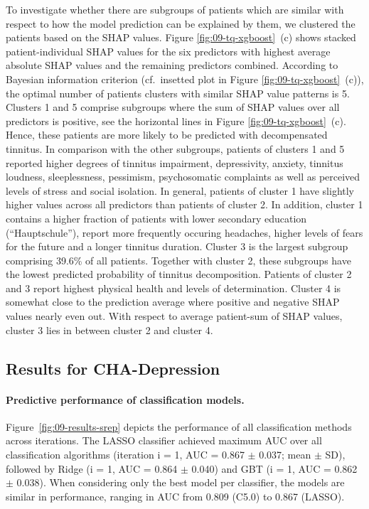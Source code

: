 \documentclass[
  oneside]{book}
\begin{document}
To investigate whether there are subgroups of patients which are similar with respect to how the model prediction can be explained by them, we clustered the patients based on the SHAP values.
Figure \ref{fig:09-tq-xgboost}~(c) shows stacked patient-individual SHAP values for the six predictors with highest average absolute SHAP values and the remaining predictors combined.
According to Bayesian information criterion (cf.~insetted plot in Figure \ref{fig:09-tq-xgboost}~(c)), the optimal number of patients clusters with similar SHAP value patterns is 5.
Clusters 1 and 5 comprise subgroups where the sum of SHAP values over all predictors is positive, see the horizontal lines in Figure \ref{fig:09-tq-xgboost}~(c).
Hence, these patients are more likely to be predicted with decompensated tinnitus.
In comparison with the other subgroups, patients of clusters 1 and 5 reported higher degrees of tinnitus impairment, depressivity, anxiety, tinnitus loudness, sleeplessness, pessimism, psychosomatic complaints as well as perceived levels of stress and social isolation.
In general, patients of cluster 1 have slightly higher values across all predictors than patients of cluster 2.
In addition, cluster 1 contains a higher fraction of patients with lower secondary education (``Hauptschule''), report more frequently occuring headaches, higher levels of fears for the future and a longer tinnitus duration.
Cluster 3 is the largest subgroup comprising 39.6\% of all patients.
Together with cluster 2, these subgroups have the lowest predicted probability of tinnitus decomposition.
Patients of cluster 2 and 3 report highest physical health and levels of determination.
Cluster 4 is somewhat close to the prediction average where positive and negative SHAP values nearly even out.
With respect to average patient-sum of SHAP values, cluster 3 lies in between cluster 2 and cluster 4.

\hypertarget{iml-results-depression}{%
\subsection{Results for CHA-Depression}\label{iml-results-depression}}

\paragraph*{Predictive performance of classification models.}

Figure~\ref{fig:09-results-srep} depicts the performance of all classification methods across iterations.
The LASSO classifier achieved maximum AUC over all classification algorithms (iteration i = 1, AUC = 0.867 \(\pm\) 0.037; mean \(\pm\) SD), followed by Ridge (i = 1, AUC = 0.864 \(\pm\) 0.040) and GBT (i = 1, AUC = 0.862 \(\pm\) 0.038).
When considering only the best model per classifier, the models are similar in performance, ranging in AUC from 0.809 (C5.0) to 0.867 (LASSO).
\end{document}
